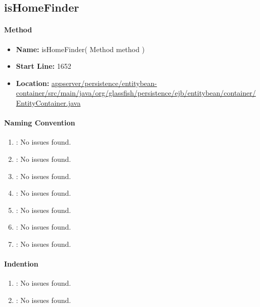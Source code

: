\subsection{isHomeFinder} %
\label{sub:isHomeFinder}

\paragraph{Method}
\label{par:method}
\begin{itemize}
	\item \textbf{Name:} isHomeFinder( Method method )
	\item \textbf{Start Line:} 1652
	\item \textbf{Location:} \url{appserver/persistence/entitybean-container/src/main/java/org/glassfish/persistence/ejb/entitybean/container/EntityContainer.java}
\end{itemize}

\paragraph{Naming Convention} %
\label{par:naming_convention}

\begin{enumerate}
	\item \emph{\checkA}: No issues found.
	\item \emph{\checkB}: No issues found.
	\item \emph{\checkC}: No issues found.
	\item \emph{\checkD}: No issues found.
	\item \emph{\checkE}: No issues found.
	\item \emph{\checkF}: No issues found.
	\item \emph{\checkG}: No issues found.
\end{enumerate}

\paragraph{Indention} %
\label{par:indention}

\begin{enumerate} [resume]
	\item \emph{\checkH}: No issues found.
	\item \emph{\checkI}: No issues found.
\end{enumerate}

